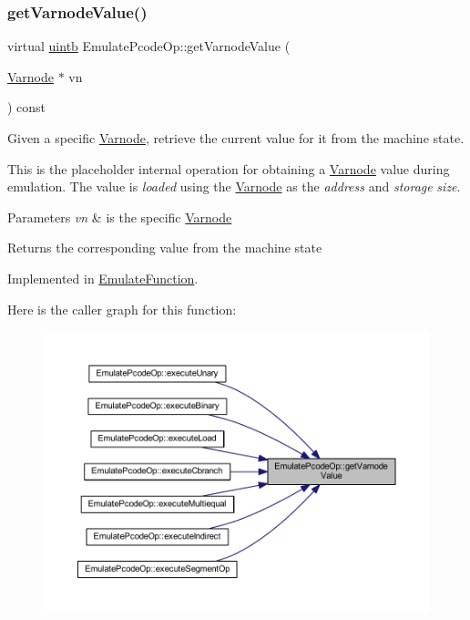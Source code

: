 \subsubsection{\texorpdfstring{getVarnodeValue()}{getVarnodeValue()}}
{\footnotesize\ttfamily virtual \mbox{\hyperlink{types_8h_a2db313c5d32a12b01d26ac9b3bca178f}{uintb}} Emulate\+Pcode\+Op\+::get\+Varnode\+Value (\begin{DoxyParamCaption}\item[{\mbox{\hyperlink{class_varnode}{Varnode}} $\ast$}]{vn }\end{DoxyParamCaption}) const\hspace{0.3cm}{\ttfamily [pure virtual]}}



Given a specific \mbox{\hyperlink{class_varnode}{Varnode}}, retrieve the current value for it from the machine state. 

This is the placeholder internal operation for obtaining a \mbox{\hyperlink{class_varnode}{Varnode}} value during emulation. The value is {\itshape loaded} using the \mbox{\hyperlink{class_varnode}{Varnode}} as the {\itshape address} and {\itshape storage} {\itshape size}. 
\begin{DoxyParams}{Parameters}
{\em vn} & is the specific \mbox{\hyperlink{class_varnode}{Varnode}} \\
\hline
\end{DoxyParams}
\begin{DoxyReturn}{Returns}
the corresponding value from the machine state 
\end{DoxyReturn}


Implemented in \mbox{\hyperlink{class_emulate_function_aea3a1fca2e8073ab6e7bcff5f05a74ca}{Emulate\+Function}}.

Here is the caller graph for this function\+:
\nopagebreak
\begin{figure}[H]
\begin{center}
\leavevmode
\includegraphics[width=350pt]{class_emulate_pcode_op_a90f1046ddac488b5a88b5b151a307eca_icgraph}
\end{center}
\end{figure}
\mbox{\label{class_emulate_pcode_op_a873b709e6195d1417d83dd8b122663dd}} 
